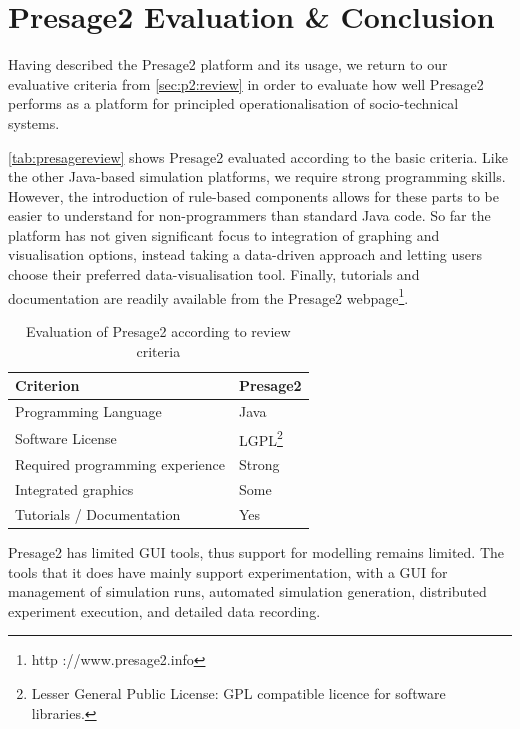 \section{Presage2 Evaluation \& Conclusion}

Having described the Presage2 platform and its usage, we return to our
evaluative criteria from \autoref{sec:p2:review} in order to evaluate how
well Presage2 performs as a platform for principled operationalisation of 
socio-technical systems.

\autoref{tab:presagereview} shows Presage2 evaluated according to the basic
criteria. Like the other Java-based simulation platforms, we require strong
programming skills. However, the introduction of rule-based components allows
for these parts to be easier to understand for non-programmers than standard
Java code. So far the platform has not given significant focus to integration of
graphing and visualisation options, instead taking a data-driven approach and
letting users choose their preferred data-visualisation tool. Finally, tutorials
and documentation are readily available from the Presage2 webpage\footnote{http
://www.presage2.info}.

\begin{table}[h]
\begin{minipage}{1\textwidth}
	\myfloatalign
	\caption{Evaluation of Presage2 according to review criteria}\label{tab:presagereview}
	\begin{tabularx}{\textwidth}{X|X}
	Criterion & Presage2 \\ \midrule
	Programming Language & Java \\
	Software License & LGPL\footnote{Lesser General Public License: \ac{GPL}
	compatible licence for software libraries.} \\
	Required programming experience & Strong \\
	Integrated graphics & Some \\
	Tutorials / Documentation & Yes \\
	\end{tabularx}
\end{minipage}
\end{table}

Presage2 has limited \ac{GUI} tools, thus support for modelling remains limited.
The tools that it does have mainly support experimentation, with a \ac{GUI} for
management of simulation runs, automated simulation generation, distributed
experiment execution, and detailed data recording.

